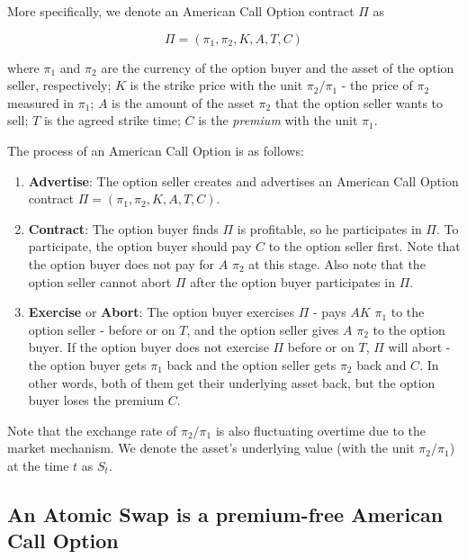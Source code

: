 More specifically, we denote an American Call Option contract $\Pi$ as

$$\Pi = (\pi_1, \pi_2, K, A, T, C)$$

where
$\pi_1$ and $\pi_2$ are the currency of the option buyer and the asset of the option seller, respectively; 
$K$ is the strike price with the unit $\pi_2 / \pi_1$ - the price of $\pi_2$ measured in $\pi_1$;
$A$ is the amount of the asset $\pi_2$ that the option seller wants to sell;
$T$ is the agreed strike time;
$C$ is the \textit{premium} with the unit $\pi_1$.

The process of an American Call Option is as follows:

\begin{enumerate}
    \item \textbf{Advertise}: The option seller creates and advertises an American Call Option contract $\Pi = (\pi_1, \pi_2, K, A, T, C)$.
    \item \textbf{Contract}: The option buyer finds $\Pi$ is profitable, so he participates in $\Pi$.
    To participate, the option buyer should pay $C$ to the option seller first.
    Note that the option buyer does not pay for $A$ $\pi_2$ at this stage.
    Also note that the option seller cannot abort $\Pi$ after the option buyer participates in $\Pi$.
    \item \textbf{Exercise} or \textbf{Abort}: The option buyer exercises $\Pi$ - pays $AK$ $\pi_1$ to the option seller - before or on $T$, and the option seller gives $A$ $\pi_2$ to the option buyer.
    If the option buyer does not exercise $\Pi$ before or on $T$, $\Pi$ will abort - the option buyer gets $\pi_1$ back and the option seller gets $\pi_2$ back and $C$. In other words, both of them get their underlying asset back, but the option buyer loses the premium $C$.
\end{enumerate}


Note that the exchange rate of $\pi_2 / \pi_1$ is also fluctuating overtime due to the market mechanism.
We denote the asset's underlying value (with the unit $\pi_2 / \pi_1$) at the time $t$ as $S_t$.












\subsection{An Atomic Swap is a premium-free American Call Option}

